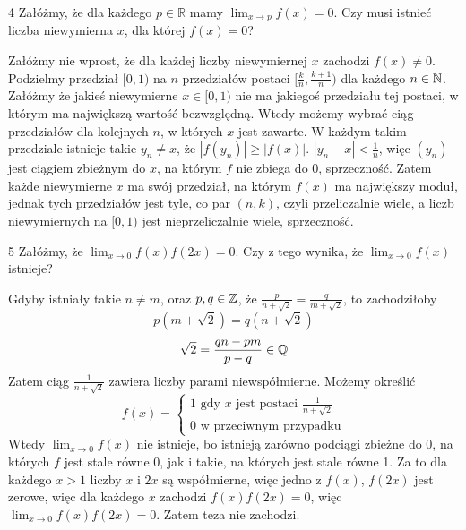 \documentclass{../note}
\begin{document}
\begin{zadanie}{4}
Załóżmy, że dla każdego $p\in\mathbb{R}$ mamy $\lim_{x\rightarrow p}f(x)=0$. Czy musi istnieć liczba niewymierna $x$, dla której $f(x)=0$?
\end{zadanie}
\begin{rozwiazanie}
Załóżmy nie wprost, że dla każdej liczby niewymiernej $x$ zachodzi $f(x) \neq 0$. Podzielmy przedział $[0, 1)$ na $n$ przedziałów postaci $[\frac{k}{n}, \frac{k+1}{n})$ dla każdego $n \in \mathbb{N}$. Załóżmy że jakieś niewymierne $x \in [0, 1)$ nie ma jakiegoś przedziału tej postaci, w którym ma największą wartość bezwzględną. Wtedy możemy wybrać ciąg przedziałów dla kolejnych $n$, w których $x$ jest zawarte. W każdym takim przedziale istnieje takie $y_n \neq x$, że $|f(y_n)| \geq |f(x)|$. $|y_n - x| < \frac1n$, więc $(y_n)$ jest ciągiem zbieżnym do $x$, na którym $f$ nie zbiega do 0, sprzeczność. Zatem każde niewymierne $x$ ma swój przedział, na którym $f(x)$ ma największy moduł, jednak tych przedziałów jest tyle, co par $(n, k)$, czyli przeliczalnie wiele, a liczb niewymiernych na $[0, 1)$ jest nieprzeliczalnie wiele, sprzeczność.
\end{rozwiazanie}

\begin{zadanie}{5}
Załóżmy, że $\lim_{x\rightarrow 0}f(x)f(2x)=0.$ Czy z tego wynika, że $\lim_{x\rightarrow 0}f(x)$ istnieje?
\end{zadanie}
\begin{rozwiazanie}
Gdyby istniały takie $n\neq m$, oraz $p, q \in \mathbb{Z}$, że $\frac{p}{n+\sqrt{2}} = \frac{q}{m+\sqrt{2}}$, to zachodziłoby
\[p(m+\sqrt{2}) = q(n+\sqrt{2})\]
\[\sqrt 2 = \frac{qn - pm}{p-q} \in \mathbb{Q}\]
Zatem ciąg $\frac{1}{n+\sqrt{2}}$ zawiera liczby parami niewspółmierne. Możemy określić
\[f(x) = \begin{cases}
    1 \text{ gdy $x$ jest postaci $\frac{1}{n+\sqrt{2}}$}\\
    0 \text{ w przeciwnym przypadku}
\end{cases}\]
Wtedy $\lim_{x\to0}f(x)$ nie istnieje, bo istnieją zarówno podciągi zbieżne do 0, na których $f$ jest stale równe 0, jak i takie, na których jest stale równe 1. Za to dla każdego $x > 1$ liczby $x$ i $2x$ są współmierne, więc jedno z $f(x)$, $f(2x)$ jest zerowe, więc dla każdego $x$ zachodzi $f(x)f(2x) = 0$, więc $\lim_{x\to0} f(x)f(2x) = 0$. Zatem teza nie zachodzi.
\end{rozwiazanie}
\end{document}
